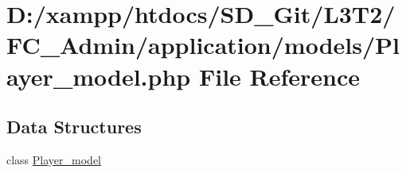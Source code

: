 \hypertarget{_player__model_8php}{}\section{D\+:/xampp/htdocs/\+S\+D\+\_\+\+Git/\+L3\+T2/\+F\+C\+\_\+\+Admin/application/models/\+Player\+\_\+model.php File Reference}
\label{_player__model_8php}
\subsection*{Data Structures}
\begin{DoxyCompactItemize}
\item 
class \hyperlink{class_player__model}{Player\+\_\+model}
\end{DoxyCompactItemize}
